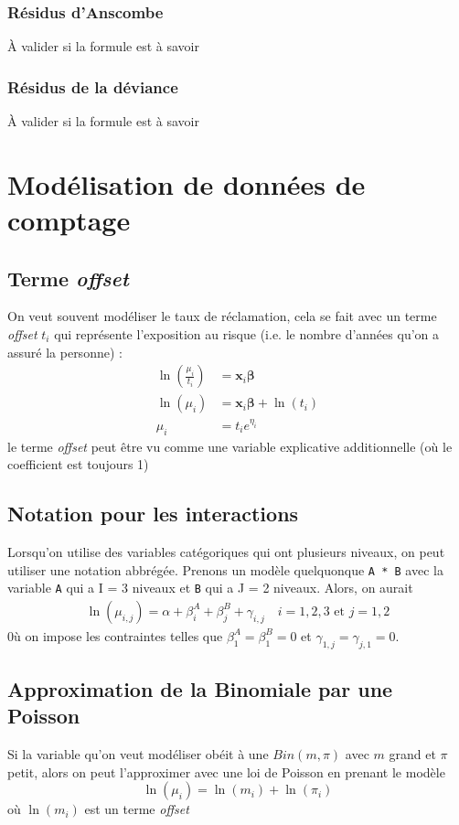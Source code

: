 \documentclass[10pt, french]{article}
\begin{document}
\begin{multicols*}{3}
\subsubsection*{Résidus d'Anscombe}
À valider si la formule est à savoir


\subsubsection*{Résidus de la déviance}
À valider si la formule est à savoir



\section{Modélisation de données de comptage}

\subsection*{Terme \emph{offset}}
On veut souvent modéliser le taux  de réclamation, cela se fait avec un terme \emph{offset} $t_i$ qui représente l'exposition au risque (i.e. le nombre d'années qu'on a assuré la personne) : 
\begin{align*}
\ln \left( \frac{\mu_i}{t_i} \right) & = \bm{x}_i \bm{\beta} \\
\ln (\mu_i) & = \bm{x}_i \bm{\beta} + \ln (t_i) \\
\mu_i & = t_i e^{\eta_i}
\end{align*}
le terme \emph{offset} peut être vu comme une variable explicative additionnelle (où le coefficient est toujours 1)

\subsection*{Notation pour les interactions}
Lorsqu'on utilise des variables catégoriques qui ont plusieurs niveaux, on peut utiliser une notation abbrégée. Prenons un modèle quelquonque \verb=A * B= avec la variable \verb=A= qui a I = 3 niveaux et \verb=B= qui a J = 2 niveaux. Alors, on aurait
\begin{align*}
\ln (\mu_{i,j}) = \alpha + \beta_i^A + \beta_j^B + \gamma_{i,j} \quad i = 1,2,3 \text{ et } j = 1,2
\end{align*}
0ù on impose les contraintes telles que $\beta_1^A = \beta_1^B = 0$ et $\gamma_{1,j} = \gamma_{j,1} = 0$. 

\subsection*{Approximation de la Binomiale par une Poisson}
Si la variable qu'on veut modéliser obéit à une $Bin(m, \pi)$ avec $m$ grand et $\pi$ petit, alors on peut l'approximer avec une loi de Poisson en prenant le modèle
\[\ln(\mu_i) = \ln(m_i) + \ln(\pi_i) \]
où $\ln(m_i)$ est un terme \emph{offset}


\end{multicols*}
\end{document}
